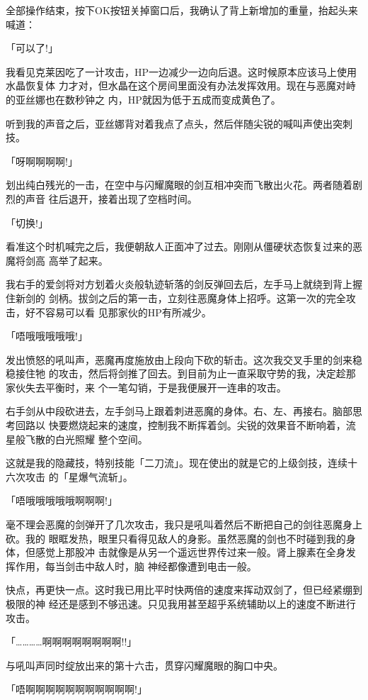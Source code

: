 \documentclass[11pt]{book}
\begin{document}
全部操作结束，按下OK按钮关掉窗口后，我确认了背上新增加的重量，抬起头来喊道：

「可以了!」

我看见克莱因吃了一计攻击，HP一边减少一边向后退。这时候原本应该马上使用水晶恢复体
力才对，但水晶在这个房间里面没有办法发挥效用。现在与恶魔对峙的亚丝娜也在数秒钟之
内，HP就因为低于五成而变成黄色了。

听到我的声音之后，亚丝娜背对着我点了点头，然后伴随尖锐的喊叫声使出突刺技。

「呀啊啊啊啊!」

划出纯白残光的一击，在空中与闪耀魔眼的剑互相冲突而飞散出火花。两者随着剧烈的声音
往后退开，接着出现了空档时间。

「切换!」

看准这个时机喊完之后，我便朝敌人正面冲了过去。刚刚从僵硬状态恢复过来的恶魔将剑高
高举了起来。

我右手的爱剑将对方划着火炎般轨迹斩落的剑反弹回去后，左手马上就绕到背上握住新剑的
剑柄。拔剑之后的第一击，立刻往恶魔身体上招呼。这第一次的完全攻击，好不容易可以看
见那家伙的HP有所减少。

「唔哦哦哦哦哦!」

发出愤怒的吼叫声，恶魔再度施放由上段向下砍的斩击。这次我交叉手里的剑来稳稳接住牠
的攻击，然后将剑推了回去。到目前为止一直采取守势的我，决定趁那家伙失去平衡时，来
个一笔勾销，于是我便展开一连串的攻击。

右手剑从中段砍进去，左手剑马上跟着刺进恶魔的身体。右、左、再接右。脑部思考回路以
快要燃烧起来的速度，控制我不断挥着剑。尖锐的效果音不断响着，流星般飞散的白光照耀
整个空间。

这就是我的隐藏技，特别技能「二刀流」。现在使出的就是它的上级剑技，连续十六次攻击
的「星爆气流斩」。

「唔哦哦哦哦哦啊啊啊!」

毫不理会恶魔的剑弹开了几次攻击，我只是吼叫着然后不断把自己的剑往恶魔身上砍。我的
眼眶发热，眼里只看得见敌人的身影。虽然恶魔的剑也不时碰到我的身体，但感觉上那股冲
击就像是从另一个遥远世界传过来一般。肾上腺素在全身发挥作用，每当剑击中敌人时，脑
神经都像遭到电击一般。

快点，再更快一点。这时我已用比平时快两倍的速度来挥动双剑了，但已经紧绷到极限的神
经还是感到不够迅速。只见我用甚至超乎系统辅助以上的速度不断进行攻击。

「…………啊啊啊啊啊啊啊啊!!」

与吼叫声同时绽放出来的第十六击，贯穿闪耀魔眼的胸口中央。

「唔啊啊啊啊啊啊啊啊啊啊啊!」
\end{document}
